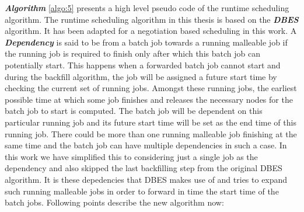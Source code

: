 \textbf{\textit{Algorithm }}\ref{algo:5} presents a high level pseudo code of the runtime scheduling algorithm. The runtime scheduling algorithm in this thesis is based on the \textbf{\textit{DBES}} algorithm\cite{laxmikant}. It has been adapted for a negotiation based scheduling in this work. A \textbf{\textit{Dependency}} is said to be from a batch job towards a running malleable job if the running job is required to finish only after which this batch job can potentially start. This happens when a forwarded batch job cannot start and during the backfill algorithm, the job will be assigned a future start time by checking the current set of running jobs. Amongst these running jobs, the earliest possible time at which some job finishes and releases the necessary nodes for the batch job to start is computed. The batch job will be dependent on this particular running job and its future start time will be set as the end time of this running job. There could be more than one running malleable job finishing at the same time and the batch job can have multiple dependencies in such a case. In this work we have simplified this to considering just a single job as the dependency and also skipped the last backfilling step from the original DBES algorithm. It is these depedencies that DBES makes use of and tries to expand such running malleable jobs in order to forward in time the start time of the batch jobs. Following points describe the new algorithm now:
